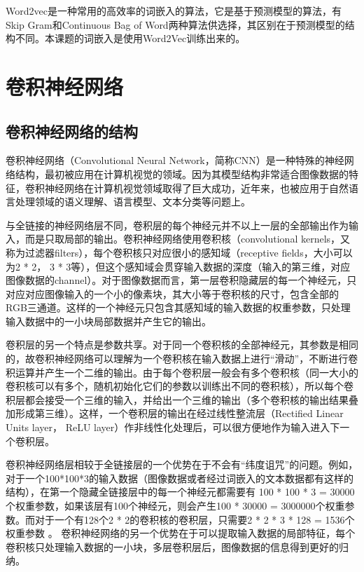 Word2vec是一种常用的高效率的词嵌入的算法，它是基于预测模型的算法，有Skip Gram和Continuous Bag of Word两种算法供选择，其区别在于预测模型的结构不同。本课题的词嵌入是使用Word2Vec训练出来的。

\section{卷积神经网络}
\subsection{卷积神经网络的结构}
卷积神经网络（Convolutional Neural Network，简称CNN）是一种特殊的神经网络结构，最初被应用在计算机视觉的领域。因为其模型结构非常适合图像数据的特征，卷积神经网络在计算机视觉领域取得了巨大成功，近年来，也被应用于自然语言处理领域的语义理解、语言模型、文本分类等问题上。

与全链接的神经网络层不同，卷积层的每个神经元并不以上一层的全部输出作为输入，而是只取局部的输出。卷积神经网络使用卷积核（convolutional kernels，又称为过滤器filters），每个卷积核只对应很小的感知域（receptive fields，大小可以为2 * 2， 3 * 3等），但这个感知域会贯穿输入数据的深度（输入的第三维，对应图像数据的channel）。对于图像数据而言，第一层卷积隐藏层的每一个神经元，只对应对应图像输入的一个小的像素块，其大小等于卷积核的尺寸，包含全部的RGB三通道。这样的一个神经元只包含其感知域的输入数据的权重参数，只处理输入数据中的一小块局部数据并产生它的输出。

卷积层的另一个特点是参数共享。对于同一个卷积核的全部神经元，其参数是相同的，故卷积神经网络可以理解为一个卷积核在输入数据上进行“滑动”，不断进行卷积运算并产生一个二维的输出。由于每个卷积层一般会有多个卷积核（同一大小的卷积核可以有多个，随机初始化它们的参数以训练出不同的卷积核），所以每个卷积层都会接受一个三维的输入，并给出一个三维的输出（多个卷积核的输出结果叠加形成第三维）。这样，一个卷积层的输出在经过线性整流层（Rectified Linear Units layer， ReLU layer）作非线性化处理后，可以很方便地作为输入进入下一个卷积层。

卷积神经网络层相较于全链接层的一个优势在于不会有“纬度诅咒”的问题。例如，对于一个100*100*3的输入数据（图像数据或者经过词嵌入的文本数据都有这样的结构），在第一个隐藏全链接层中的每一个神经元都需要有 100 * 100 * 3 = 30000个权重参数，如果该层有100个神经元，则会产生100 * 30000 = 3000000个权重参数。而对于一个有128个2 * 2的卷积核的卷积层，只需要2 * 2 * 3 * 128 = 1536个权重参数 。
卷积神经网络的另一个优势在于可以提取输入数据的局部特征，每个卷积核只处理输入数据的一小块，多层卷积层后，图像数据的信息得到更好的归纳。

